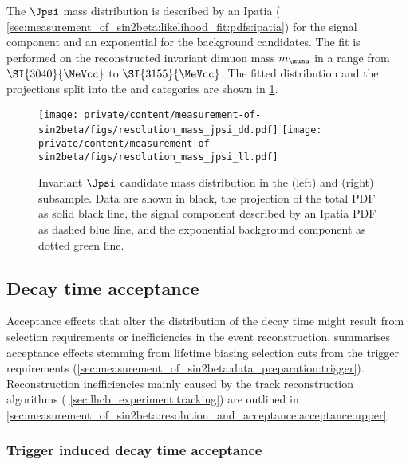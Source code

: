 The $\Jpsi$ mass distribution is described by an Ipatia \PDF (\cf
\cref{sec:measurement_of_sin2beta:likelihood_fit:pdfs:ipatia}) for the signal
component and an exponential \PDF for the background candidates. The fit is
performed on the reconstructed invariant dimuon mass $m_{\mumu}$ in a range from
$\SI{3040}{\MeVcc}$ to $\SI{3155}{\MeVcc}$. The fitted distribution and the \PDF
projections split into the \catDD and \catLL categories are shown in 
\cref{fig:measurement_of_sin2beta:resolution_and_acceptance:resolution:jpsi_mass}.
%
\begin{figure}[h]
\texttt{[image: private/content/measurement-of-sin2beta/figs/resolution\_mass\_jpsi\_dd.pdf]}
\texttt{[image: private/content/measurement-of-sin2beta/figs/resolution\_mass\_jpsi\_ll.pdf]}
\label{fig:measurement_of_sin2beta:resolution_and_acceptance:resolution:jpsi_mass}
\caption{Invariant $\Jpsi$ candidate mass distribution in the (left) \catDD and
(right) \catLL subsample. Data are shown in black, the projection of the total
\acs{PDF} as solid black line, the signal component described by an Ipatia
\acs{PDF} as dashed blue line, and the exponential background component as
dotted green line.}
\end{figure}
%



\subsection{Decay time acceptance}
\label{sec:measurement_of_sin2beta:resolution_and_acceptance:acceptance}

Acceptance effects that alter the distribution of the decay time might result
from selection requirements or inefficiencies in the event reconstruction.
summarises acceptance effects stemming from lifetime biasing selection cuts from
the trigger requirements
(\cf \cref{sec:measurement_of_sin2beta:data_preparation:trigger}). Reconstruction
inefficiencies mainly caused by the \VELO track reconstruction algorithms (\cf
\cref{sec:lhcb_experiment:tracking}) are outlined in
\cref{sec:measurement_of_sin2beta:resolution_and_acceptance:acceptance:upper}.

\subsubsection{Trigger induced decay time acceptance}
\label{sec:measurement_of_sin2beta:resolution_and_acceptance:acceptance:lower}

